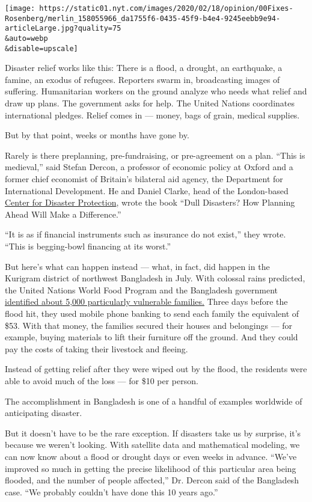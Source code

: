 \texttt{[image: https://static01.nyt.com/images/2020/02/18/opinion/00Fixes-Rosenberg/merlin\_158055966\_da1755f6-0435-45f9-b4e4-9245eebb9e94-articleLarge.jpg?quality=75\\\&auto=webp\\\&disable=upscale]}

Disaster relief works like this: There is a flood, a drought, an
earthquake, a famine, an exodus of refugees. Reporters swarm in,
broadcasting images of suffering. Humanitarian workers on the ground
analyze who needs what relief and draw up plans. The government asks for
help. The United Nations coordinates international pledges. Relief comes
in --- money, bags of grain, medical supplies.

But by that point, weeks or months have gone by.

Rarely is there preplanning, pre-fundraising, or pre-agreement on a
plan. ``This is medieval,'' said Stefan Dercon, a professor of economic
policy at Oxford and a former chief economist of Britain's bilateral aid
agency, the Department for International Development. He and Daniel
Clarke, head of the London-based
\href{https://www.disasterprotection.org/}{Center for Disaster
Protection}, wrote the book ``Dull Disasters? How Planning Ahead Will
Make a Difference.''

``It is as if financial instruments such as insurance do not exist,''
they wrote. ``This is begging-bowl financing at its worst.''

But here's what can happen instead --- what, in fact, did happen in the
Kurigram district of northwest Bangladesh in July. With colossal rains
predicted, the United Nations World Food Program and the Bangladesh
government
\href{https://www.wfp.org/news/wfp-provides-innovative-assistance-flood-affected-people-north-western-bangladesh}{identified
about 5,000 particularly vulnerable families.} Three days before the
flood hit, they used mobile phone banking to send each family the
equivalent of \$53. With that money, the families secured their houses
and belongings --- for example, buying materials to lift their furniture
off the ground. And they could pay the costs of taking their livestock
and fleeing.

Instead of getting relief after they were wiped out by the flood, the
residents were able to avoid much of the loss --- for \$10 per person.

The accomplishment in Bangladesh is one of a handful of examples
worldwide of anticipating disaster.

But it doesn't have to be the rare exception. If disasters take us by
surprise, it's because we weren't looking. With satellite data and
mathematical modeling, we can now know about a flood or drought days or
even weeks in advance. ``We've improved so much in getting the precise
likelihood of this particular area being flooded, and the number of
people affected,'' Dr. Dercon said of the Bangladesh case. ``We probably
couldn't have done this 10 years ago.''

